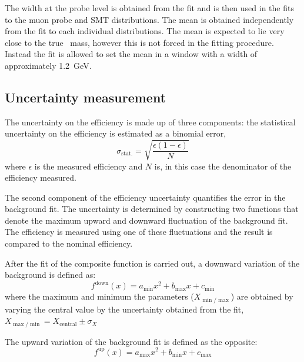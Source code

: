 The width at the probe level is obtained from the fit and is then used in the fits to the muon probe and SMT distributions. The mean is obtained independently from the fit to each individual distributions. The mean is expected to lie very close to the true \jpsi\ mass, however this is not forced in the fitting procedure. Instead the fit is allowed to set the mean in a window with a width of approximately \SI{1.2}{\GeV}. 

\subsection{Uncertainty measurement}\label{sec:CalibrationUncertainty}

The uncertainty on the efficiency is made up of three components: the statistical uncertainty on the efficiency is estimated as a binomial error,
%
\begin{equation}
  \sigma_{\textrm{stat.}} = \sqrt{\frac{\epsilon(1-\epsilon)}{N}}
\end{equation}
%
where $\epsilon$ is the measured efficiency and $N$ is, in this case the denominator of the efficiency measured.

The second component of the efficiency uncertainty quantifies the error in the background fit. The uncertainty is determined by constructing two functions that denote the maximum upward and downward fluctuation of the background fit. The efficiency is measured using one of these fluctuations and the result is compared to the nominal efficiency.

After the fit of the composite function is carried out, a downward variation of the background is defined as:
%
\begin{equation}
  f^{\textrm{down}}(x) = a_{\min}x^{2} + b_{\max}x + c_{\min}
\end{equation}
%
where the maximum and minimum the parameters ($X_{\min/\max}$) are obtained by varying the central value by the uncertainty obtained from the fit,
%
$X_{\max/\min}=X_{\textrm{central}}\pm\sigma_{X}$

The upward variation of the background fit is defined as the opposite:
%
\begin{equation}
  f^{\textrm{up}}(x) = a_{\max}x^{2} + b_{\min}x + c_{\max}
\end{equation}


